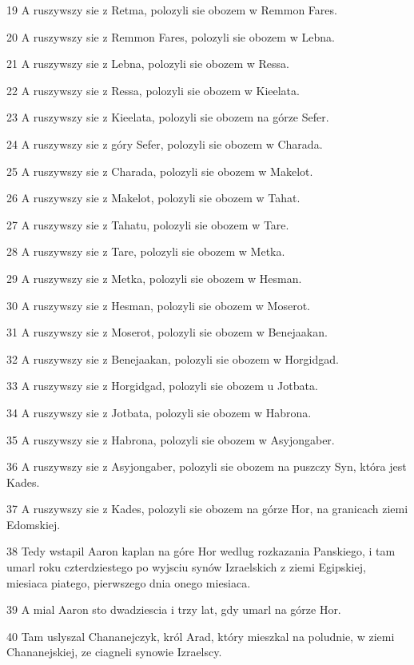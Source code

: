 \par 19 A ruszywszy sie z Retma, polozyli sie obozem w Remmon Fares.
\par 20 A ruszywszy sie z Remmon Fares, polozyli sie obozem w Lebna.
\par 21 A ruszywszy sie z Lebna, polozyli sie obozem w Ressa.
\par 22 A ruszywszy sie z Ressa, polozyli sie obozem w Kieelata.
\par 23 A ruszywszy sie z Kieelata, polozyli sie obozem na górze Sefer.
\par 24 A ruszywszy sie z góry Sefer, polozyli sie obozem w Charada.
\par 25 A ruszywszy sie z Charada, polozyli sie obozem w Makelot.
\par 26 A ruszywszy sie z Makelot, polozyli sie obozem w Tahat.
\par 27 A ruszywszy sie z Tahatu, polozyli sie obozem w Tare.
\par 28 A ruszywszy sie z Tare, polozyli sie obozem w Metka.
\par 29 A ruszywszy sie z Metka, polozyli sie obozem w Hesman.
\par 30 A ruszywszy sie z Hesman, polozyli sie obozem w Moserot.
\par 31 A ruszywszy sie z Moserot, polozyli sie obozem w Benejaakan.
\par 32 A ruszywszy sie z Benejaakan, polozyli sie obozem w Horgidgad.
\par 33 A ruszywszy sie z Horgidgad, polozyli sie obozem u Jotbata.
\par 34 A ruszywszy sie z Jotbata, polozyli sie obozem w Habrona.
\par 35 A ruszywszy sie z Habrona, polozyli sie obozem w Asyjongaber.
\par 36 A ruszywszy sie z Asyjongaber, polozyli sie obozem na puszczy Syn, która jest Kades.
\par 37 A ruszywszy sie z Kades, polozyli sie obozem na górze Hor, na granicach ziemi Edomskiej.
\par 38 Tedy wstapil Aaron kaplan na góre Hor wedlug rozkazania Panskiego, i tam umarl roku czterdziestego po wyjsciu synów Izraelskich z ziemi Egipskiej, miesiaca piatego, pierwszego dnia onego miesiaca.
\par 39 A mial Aaron sto dwadziescia i trzy lat, gdy umarl na górze Hor.
\par 40 Tam uslyszal Chananejczyk, król Arad, który mieszkal na poludnie, w ziemi Chananejskiej, ze ciagneli synowie Izraelscy.
